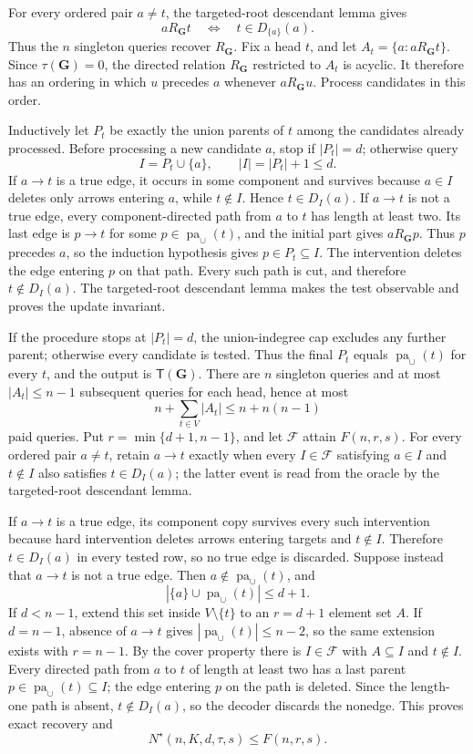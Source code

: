 For every ordered pair \(a\ne t\), the targeted-root descendant lemma gives
\[
 aR_{\mathbf G}t
 \quad\Longleftrightarrow\quad
 t\in D_{\{a\}}(a).
\]
Thus the \(n\) singleton queries recover \(R_{\mathbf G}\). Fix a head \(t\), and let \(A_t=\{a:aR_{\mathbf G}t\}\). Since \(\tau(\mathbf G)=0\), the directed relation \(R_{\mathbf G}\) restricted to \(A_t\) is acyclic. It therefore has an ordering in which \(u\) precedes \(a\) whenever \(aR_{\mathbf G}u\). Process candidates in this order.

Inductively let \(P_t\) be exactly the union parents of \(t\) among the candidates already processed. Before processing a new candidate \(a\), stop if \(|P_t|=d\); otherwise query
\[
 I=P_t\cup\{a\},\qquad |I|=|P_t|+1\le d.
\]
If \(a\to t\) is a true edge, it occurs in some component and survives because \(a\in I\) deletes only arrows entering \(a\), while \(t\notin I\). Hence \(t\in D_I(a)\). If \(a\to t\) is not a true edge, every component-directed path from \(a\) to \(t\) has length at least two. Its last edge is \(p\to t\) for some \(p\in\operatorname{pa}_{\cup}(t)\), and the initial part gives \(aR_{\mathbf G}p\). Thus \(p\) precedes \(a\), so the induction hypothesis gives \(p\in P_t\subseteq I\). The intervention deletes the edge entering \(p\) on that path. Every such path is cut, and therefore \(t\notin D_I(a)\). The targeted-root descendant lemma makes the test observable and proves the update invariant.

If the procedure stops at \(|P_t|=d\), the union-indegree cap excludes any further parent; otherwise every candidate is tested. Thus the final \(P_t\) equals \(\operatorname{pa}_{\cup}(t)\) for every \(t\), and the output is \(\mathsf T(\mathbf G)\). There are \(n\) singleton queries and at most \(|A_t|\le n-1\) subsequent queries for each head, hence at most
\[
 n+\sum_{t\in V}|A_t|\le n+n(n-1)
\]
paid queries.
Put \(r=\min\{d+1,n-1\}\), and let \(\mathcal F\) attain \(F(n,r,s)\). For every ordered pair \(a\ne t\), retain \(a\to t\) exactly when every \(I\in\mathcal F\) satisfying \(a\in I\) and \(t\notin I\) also satisfies \(t\in D_I(a)\); the latter event is read from the oracle by the targeted-root descendant lemma.

If \(a\to t\) is a true edge, its component copy survives every such intervention because hard intervention deletes arrows entering targets and \(t\notin I\). Therefore \(t\in D_I(a)\) in every tested row, so no true edge is discarded. Suppose instead that \(a\to t\) is not a true edge. Then \(a\notin\operatorname{pa}_{\cup}(t)\), and
\[
 |\{a\}\cup\operatorname{pa}_{\cup}(t)|\le d+1.
\]
If \(d<n-1\), extend this set inside \(V\setminus\{t\}\) to an \(r=d+1\) element set \(A\). If \(d=n-1\), absence of \(a\to t\) gives \(|\operatorname{pa}_{\cup}(t)|\le n-2\), so the same extension exists with \(r=n-1\). By the cover property there is \(I\in\mathcal F\) with \(A\subseteq I\) and \(t\notin I\). Every directed path from \(a\) to \(t\) of length at least two has a last parent \(p\in\operatorname{pa}_{\cup}(t)\subseteq I\); the edge entering \(p\) on the path is deleted. Since the length-one path is absent, \(t\notin D_I(a)\), so the decoder discards the nonedge. This proves exact recovery and
\[
 N^{\star}(n,K,d,\tau,s)\le F(n,r,s).
\]

